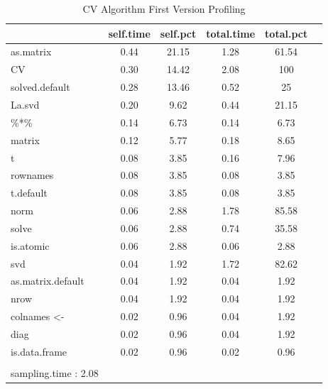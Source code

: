 \documentclass[Research_Module_ES.tex]{subfiles}
\begin{document}
\begin{table}[!h]
	\label{CValt}
	\centering
	\caption{CV Algorithm First Version Profiling }
	\begin{tabular}{lccccc}
		\toprule
		\midrule
		\textbf{\scriptsize }
		&\textbf{\scriptsize self.time}
		&\textbf{\scriptsize self.pct}
		&\textbf{\scriptsize total.time}
		&\textbf{\scriptsize total.pct}
		\\\midrule\midrule
		
		
		\scriptsize as.matrix& \scriptsize 0.44 & \scriptsize 21.15 &\scriptsize 1.28 & \scriptsize 61.54 \\
		\scriptsize CV  &\scriptsize 0.30 & \scriptsize 14.42 &\scriptsize 2.08 & \scriptsize 100 \\
		\scriptsize solved.default & \scriptsize 0.28 & \scriptsize 13.46 &\scriptsize 0.52 & \scriptsize 25 \\
		\scriptsize La.svd  &\scriptsize 0.20 & \scriptsize 9.62 &\scriptsize 0.44 & \scriptsize 21.15 \\
		\scriptsize \%*\% &\scriptsize 0.14 & \scriptsize 6.73 &\scriptsize 0.14& \scriptsize 6.73 \\
		\scriptsize matrix  &\scriptsize 0.12 & \scriptsize 5.77 &\scriptsize 0.18 & \scriptsize 8.65 \\
		\scriptsize t & \scriptsize 0.08 & \scriptsize 3.85 &\scriptsize 0.16 & \scriptsize 7.96 \\
		\scriptsize rownames  &\scriptsize 0.08 & \scriptsize 3.85 &\scriptsize 0.08 & \scriptsize 3.85 \\
		\scriptsize t.default  &\scriptsize 0.08 & \scriptsize 3.85 &\scriptsize 0.08 & \scriptsize 3.85\\
		\scriptsize norm  &\scriptsize 0.06 & \scriptsize 2.88 &\scriptsize 1.78 & \scriptsize  85.58\\
		\scriptsize solve  &\scriptsize  0.06 & \scriptsize 2.88 &\scriptsize 0.74  & \scriptsize 35.58 \\
		\scriptsize  is.atomic &\scriptsize  0.06 & \scriptsize 2.88  &\scriptsize 0.06 & \scriptsize 2.88 \\
		\scriptsize svd  &\scriptsize 0.04 & \scriptsize 1.92  &\scriptsize 1.72  & \scriptsize82.62  \\
		\scriptsize  as.matrix.default &\scriptsize 0.04 & \scriptsize 1.92 &\scriptsize 0.04 & \scriptsize 1.92  \\
		\scriptsize  nrow &\scriptsize 0.04 & \scriptsize 1.92 &\scriptsize 0.04 & \scriptsize  1.92\\
		\scriptsize  colnames <- &\scriptsize  0.02 & \scriptsize 0.96 &\scriptsize 0.04 & \scriptsize 1.92 \\
		\scriptsize  diag &\scriptsize 0.02 & \scriptsize 0.96 &\scriptsize 0.04 & \scriptsize  1.92\\
		\scriptsize is.data.frame  &\scriptsize  0.02 & \scriptsize  0.96 &\scriptsize  0.02& \scriptsize 0.96  \\
		\\
		\scriptsize sampling.time : 2.08
	\end{tabular}
\end{table}
\end{document}

